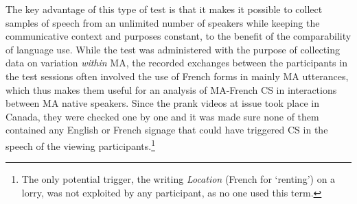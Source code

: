 \documentclass[output=paper]{langscibook}
\begin{document}
The key advantage of this type of test is that it makes it possible to collect samples of speech from an unlimited number of speakers while keeping the communicative context and purposes constant, to the benefit of the comparability of language use. While the test was administered with the purpose of collecting data on variation \textit{within} \gls*{MA}, the recorded exchanges between the participants in the test sessions often involved the use of French forms in mainly \gls*{MA} utterances, which thus makes them useful for an analysis of \gls*{MA}-French \gls*{CS} in interactions between \gls*{MA} native speakers. Since the prank videos at issue took place in Canada, they were checked one by one and it was made sure none of them contained any English or French signage that could have triggered \gls*{CS} in the speech of the viewing participants.\footnote{The only potential trigger, the writing \textit{Location} (French for ‘renting’) on a lorry, was not exploited by any participant, as no one used this term.}
\end{document}
